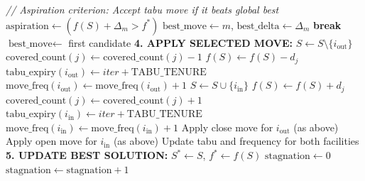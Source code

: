\documentclass[11pt,a4paper]{article}
\begin{document}
\begin{algorithm}[H]
\caption{Tabu Search for MCLP (Part 2: Selection \& Updates)}
\begin{algorithmic}[1]
    
        \State \textit{// Aspiration criterion: Accept tabu move if it beats global best}
        \State $\text{aspiration} \leftarrow (f(S) + \Delta_m > f^*)$
        \State
            \State $\text{best\_move} \leftarrow m$, $\text{best\_delta} \leftarrow \Delta_m$
             \textbf{break} 
            \EndIf
        \EndIf
    \EndFor
    \State
        \State $\text{best\_move} \leftarrow$ first candidate 
    \EndIf
    \State
    \State \textbf{4. APPLY SELECTED MOVE:}
        \State $S \leftarrow S \setminus \{i_{\text{out}}\}$ 
            \State $\text{covered\_count}(j) \leftarrow \text{covered\_count}(j) - 1$ 
                \State $f(S) \leftarrow f(S) - d_j$ 
            \EndIf
        \EndFor
        \State $\text{tabu\_expiry}(i_{\text{out}}) \leftarrow iter + \text{TABU\_TENURE}$ 
        \State $\text{move\_freq}(i_{\text{out}}) \leftarrow \text{move\_freq}(i_{\text{out}}) + 1$ 
        \State $S \leftarrow S \cup \{i_{\text{in}}\}$ 
                \State $f(S) \leftarrow f(S) + d_j$ 
            \EndIf
            \State $\text{covered\_count}(j) \leftarrow \text{covered\_count}(j) + 1$
        \EndFor
        \State $\text{tabu\_expiry}(i_{\text{in}}) \leftarrow iter + \text{TABU\_TENURE}$
        \State $\text{move\_freq}(i_{\text{in}}) \leftarrow \text{move\_freq}(i_{\text{in}}) + 1$
        \State Apply close move for $i_{\text{out}}$ (as above)
        \State Apply open move for $i_{\text{in}}$ (as above)
        \State Update tabu and frequency for both facilities
    \EndIf
    \State
    \State \textbf{5. UPDATE BEST SOLUTION:}
        \State $S^* \leftarrow S$, $f^* \leftarrow f(S)$ 
        \State $\text{stagnation} \leftarrow 0$
    \Else
        \State $\text{stagnation} \leftarrow \text{stagnation} + 1$
    \EndIf

\end{algorithmic}
\end{algorithm}
\end{document}
